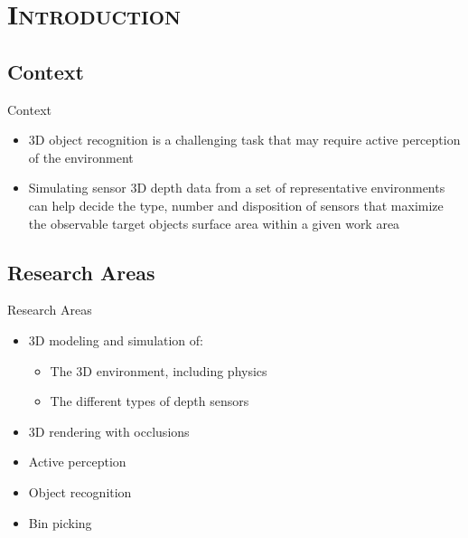 \section{\scshape Introduction}\label{sec:introduction}

\subsection{Context}
\begin{frame}{Context}
	\begin{itemize}
		\item 3D object recognition is a challenging task that may require active perception of the environment
		\item Simulating sensor 3D depth data from a set of representative environments can help decide the type, number and disposition of sensors that maximize the observable target objects surface area within a given work area
	\end{itemize}
\end{frame}


\subsection{Research Areas}
\begin{frame}{Research Areas}
	\begin{itemize}
		\item 3D modeling and simulation of:
		\begin{itemize}
			\item The 3D environment, including physics
			\item The different types of depth sensors
		\end{itemize}
		\item 3D rendering with occlusions
		\item Active perception
		\item Object recognition
		\item Bin picking
	\end{itemize}
\end{frame}

